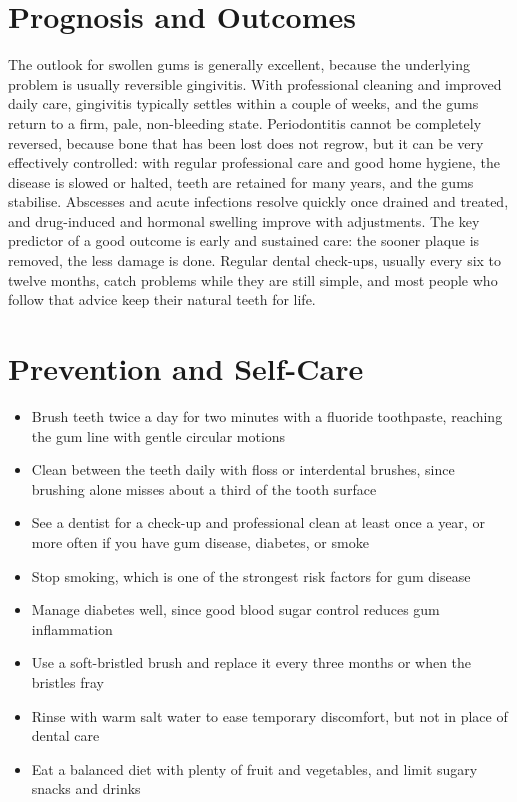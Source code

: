 \section*{Prognosis and Outcomes}
The outlook for swollen gums is generally excellent, because the underlying problem is usually reversible gingivitis. With professional cleaning and improved daily care, gingivitis typically settles within a couple of weeks, and the gums return to a firm, pale, non-bleeding state. Periodontitis cannot be completely reversed, because bone that has been lost does not regrow, but it can be very effectively controlled: with regular professional care and good home hygiene, the disease is slowed or halted, teeth are retained for many years, and the gums stabilise. Abscesses and acute infections resolve quickly once drained and treated, and drug-induced and hormonal swelling improve with adjustments. The key predictor of a good outcome is early and sustained care: the sooner plaque is removed, the less damage is done. Regular dental check-ups, usually every six to twelve months, catch problems while they are still simple, and most people who follow that advice keep their natural teeth for life.

\section*{Prevention and Self-Care}
\begin{itemize}
    \item Brush teeth twice a day for two minutes with a fluoride toothpaste, reaching the gum line with gentle circular motions
    \item Clean between the teeth daily with floss or interdental brushes, since brushing alone misses about a third of the tooth surface
    \item See a dentist for a check-up and professional clean at least once a year, or more often if you have gum disease, diabetes, or smoke
    \item Stop smoking, which is one of the strongest risk factors for gum disease
    \item Manage diabetes well, since good blood sugar control reduces gum inflammation
    \item Use a soft-bristled brush and replace it every three months or when the bristles fray
    \item Rinse with warm salt water to ease temporary discomfort, but not in place of dental care
    \item Eat a balanced diet with plenty of fruit and vegetables, and limit sugary snacks and drinks
\end{itemize}

